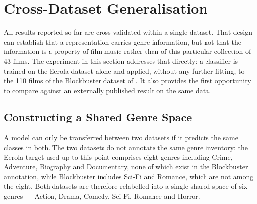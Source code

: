 %
%
%

\section{Cross-Dataset Generalisation}
\label{sec:zero_shot}

All results reported so far are cross-validated within a single dataset. That design can
establish that a representation carries genre information, but not that the information
is a property of film music rather than of this particular collection of 43 films. The
experiment in this section addresses that directly: a classifier is trained on the Eerola
dataset alone and applied, without any further fitting, to the 110 films of the Blockbuster
dataset of \citet{ma2021computational}. It also provides the first opportunity to compare
against an externally published result on the same data.

\subsection{Constructing a Shared Genre Space}
\label{subsec:shared_genres}

A model can only be transferred between two datasets if it predicts the same classes in
both. The two datasets do not annotate the same genre inventory: the Eerola target used up
to this point comprises eight genres including Crime, Adventure, Biography and
Documentary, none of which exist in the Blockbuster annotation, while Blockbuster includes
Sci-Fi and Romance, which are not among the eight. Both datasets are therefore relabelled
into a single shared space of six genres --- Action, Drama, Comedy, Sci-Fi, Romance and
Horror.

